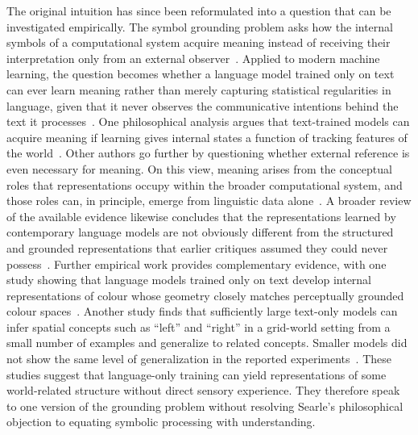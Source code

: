 \documentclass[acmsmall,screen,review,anonymous]{acmart}
\begin{document}
The original intuition has since been reformulated into a question that can be investigated empirically.
%
The symbol grounding problem asks how the internal symbols of a computational system acquire meaning instead of receiving their interpretation only from an external observer~\citep{HARNAD1990335}.
%
Applied to modern machine learning, the question becomes whether a language model trained only on text can ever learn meaning rather than merely capturing statistical regularities in language, given that it never observes the communicative intentions behind the text it processes~\citep{bender-koller-2020-climbing}.
%
One philosophical analysis argues that text-trained models can acquire meaning if learning gives internal states a function of tracking features of the world~\citep{Coelho_Mollo_2026}. 
%
Other authors go further by questioning whether external reference is even necessary for meaning. 
%
On this view, meaning arises from the conceptual roles that representations occupy within the broader computational system, and those roles can, in principle, emerge from linguistic data alone~\citep{piantadosi2022meaning}. 
%
A broader review of the available evidence likewise concludes that the representations learned by contemporary language models are not obviously different from the structured and grounded representations that earlier critiques assumed they could never possess~\citep{10.1098/rsta.2022.0041}. 
%
Further empirical work provides complementary evidence, with one study showing that language models trained only on text develop internal representations of colour whose geometry closely matches perceptually grounded colour spaces~\citep{abdou-etal-2021-language}.
%
Another study finds that sufficiently large text-only models can infer spatial concepts such as ``left'' and ``right'' in a grid-world setting from a small number of examples and generalize to related concepts.
%
Smaller models did not show the same level of generalization in the reported experiments~\citep{patel2022mapping}.
%
These studies suggest that language-only training can yield representations of some world-related structure without direct sensory experience.
%
They therefore speak to one version of the grounding problem without resolving Searle's philosophical objection to equating symbolic processing with understanding.
\end{document}
